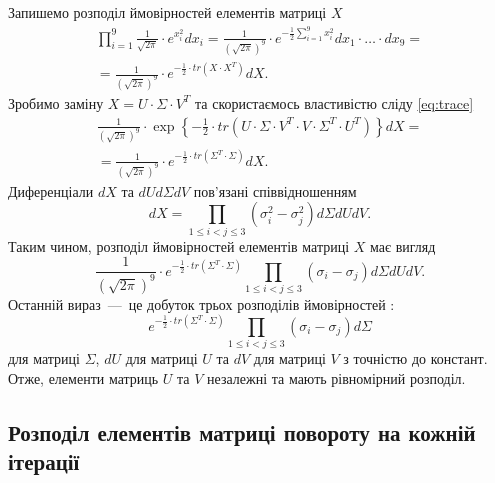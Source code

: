 Запишемо розподіл ймовірностей елементів матриці $X$
\begin{equation*}
  \begin{gathered}
    \prod \limits_{i=1}^9 \frac{1}{\sqrt{2 \pi}} \cdot e^{x_i^2} dx_i =
    \frac{1}{\left( \sqrt{2 \pi} \right)^9} \cdot
    e^{-\frac{1}{2} \sum \limits_{i=1}^9 x_i^2}
    dx_1 \cdot \dotsc \cdot dx_9 = \\
    = \frac{1}{\left( \sqrt{2 \pi} \right)^9} \cdot
    e^{-\frac{1}{2} \cdot tr \left( X \cdot X^T \right)} dX.
  \end{gathered}
\end{equation*}
Зробимо заміну $X = U \cdot \Sigma \cdot V^T$
та скористаємось властивістю сліду \eqref{eq:trace}
\begin{equation*}
  \begin{gathered}
  \frac{1}{ \left( \sqrt{2 \pi}\right)^9} \cdot
  \exp{\left\{ -\frac{1}{2} \cdot tr \left(
    U \cdot \Sigma \cdot V^T \cdot V \cdot \Sigma^T \cdot U^T
  \right)\right\}} dX = \\
  = \frac{1}{\left( \sqrt{2 \pi} \right)^9} \cdot
  e^{-\frac{1}{2} \cdot tr \left( \Sigma^T \cdot \Sigma \right)} dX.
  \end{gathered}
\end{equation*}
Диференціали $dX$ та $dU d \Sigma dV$ пов'язані співвідношенням \cite{jacobians}
\begin{equation*}
  dX =
  \prod \limits_{1 \leq i < j \leq 3} \left( \sigma_i^2 - \sigma_j^2 \right)
  d \Sigma dU dV.
\end{equation*}
Таким чином, розподіл ймовірностей елементів матриці $X$ має вигляд
\begin{equation*}
  \frac{1}{\left( \sqrt{2 \pi}\right)^9} \cdot
  e^{-\frac{1}{2} \cdot tr \left( \Sigma^T \cdot \Sigma \right) }
  \prod \limits_{1 \leq i < j \leq 3} \left( \sigma_i - \sigma_j \right)
  d \Sigma dU dV.
\end{equation*}
Останній вираз~---~це добуток трьох розподілів ймовірностей \cite{jacobians}:
\begin{equation*}
  e^{-\frac{1}{2} \cdot tr \left( \Sigma^T \cdot \Sigma \right) }
  \prod \limits_{1 \leq i < j \leq 3} \left( \sigma_i - \sigma_j \right)
  d \Sigma
\end{equation*}
для матриці $\Sigma$, $dU$ для матриці $U$ та $dV$ для матриці $V$
з точністю до констант.
Отже, елементи матриць $U$ та $V$ незалежні та мають рівномірний розподіл.

\subsection{Розподіл елементів матриці повороту на кожній ітерації}

